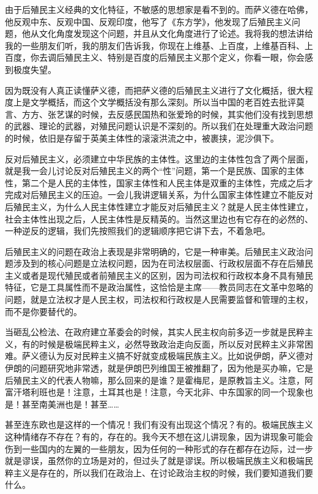 \documentclass[UTF8, 12pt, a4paper]{ctexrep}
\begin{document}
由于后殖民主义经典的文化特征，不敏感的思想家是看不到的。而萨义德在哈佛，他反观中东、反观中国、反观印度，他写了《东方学》，他发现了后殖民主义问题，他从文化角度发现这个问题，并且从文化角度进行了论述。我将我的想法讲给我的一些朋友们听，我的朋友们告诉我，你现在上维基、上百度，上维基百科、上百度，你去调后殖民主义、特别是百度的后殖民主义那个定义，你看一眼，你会感到极度失望。

因为既没有人真正读懂萨义德，而把萨义德的后殖民主义进行了文化概括，很大程度上是文学概括，而这个文学概括没有那么深刻。所以当中国的老百姓去批评莫言、方方、张艺谋的时候，去反感民国热和张爱玲的时候，其实他们没有找到思想的武器、理论的武器，对殖民问题认识是不深刻的。所以我们在处理重大政治问题的时候，依旧是存留于英美主体性的滚滚洪流之中，被裹挟，泥沙俱下。

反对后殖民主义，必须建立中华民族的主体性。这里边的主体性包含了两个层面，就是我一会儿讨论反对后殖民主义的两个“性”问题，第一个是民族、国家的主体性，第二个是人民的主体性，国家主体性和人民主体是双重的主体性，完成之后才完成对后殖民主义的压迫。一会儿我讲逻辑关系，为什么国家主体性建立不能反对后殖民主义，为什么人民主体性建立才能反对后殖民主义？就是人民主体性建立，社会主体性出现之后，人民主体性是反精英的。当然这里边也有它存在的必然的、一种逆反的逻辑，我们先按照我们的逻辑顺序把它讲下去，不着急吧。

后殖民主义的问题在政治上表现是非常明确的，它是一种审美。后殖民主义政治问题涉及到的核心问题是立法权问题，因为在司法权层面、行政权层面不存在后殖民主义或者是现代殖民或者前殖民主义的区别，因为司法权和行政权本身不具有殖民特征，它是工具属性而不是政治属性，这恰恰是主席——教员同志在文革中忽略的问题，就是立法权才是人民主权，司法权和行政权是人民需要监督和管理的主权，而不是你要替代的。

当砸乱公检法、在政府建立革委会的时候，其实人民主权向前多迈一步就是民粹主义，有的时候是极端民粹主义，必然导致政治走向反面，所以反对民粹主义非常困难。萨义德认为反对民粹主义搞不好就变成极端民族主义。比如说伊朗，萨义德对伊朗的问题研究地非常透，就是伊朗巴列维国王被推翻了，因为他是买办嘛，它是后殖民主义的代表人物嘛，那么回来的是谁？是霍梅尼，是原教旨主义。注意，阿富汗塔利班也是！注意，土耳其也是！注意，今天北非、中东国家的同一个现象也是！甚至南美洲也是！甚至……

甚至连东欧也是这样的一个情况！我们有没有出现这个情况？有的。极端民族主义这种情绪存不存在？有的，存在的。我今天不想在这儿讲现象，因为讲现象可能会伤到一些国内的左翼的一些朋友，因为任何的一种形式的存在都存在边际，过一步就是谬误，虽然你的立场是对的，但过头了就是谬误。所以极端民族主义和极端民粹主义是存在的，所以我们在政治上、在讨论政治主权的时候，我们要知道我们要什么。
\end{document}
